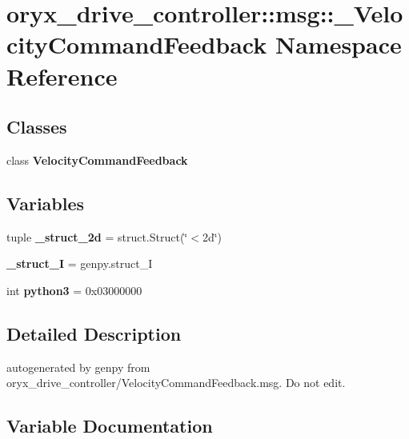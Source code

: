 \section{oryx\-\_\-drive\-\_\-controller\-:\-:msg\-:\-:\-\_\-\-Velocity\-Command\-Feedback \-Namespace \-Reference}
\label{namespaceoryx__drive__controller_1_1msg_1_1__VelocityCommandFeedback}
\subsection*{\-Classes}
\begin{DoxyCompactItemize}
\item 
class {\bf \-Velocity\-Command\-Feedback}
\end{DoxyCompactItemize}
\subsection*{\-Variables}
\begin{DoxyCompactItemize}
\item 
tuple {\bf \-\_\-struct\-\_\-2d} = struct.\-Struct(\char`\"{}$<$2d\char`\"{})
\item 
{\bf \-\_\-struct\-\_\-\-I} = genpy.\-struct\-\_\-\-I
\item 
int {\bf python3} = 0x03000000
\end{DoxyCompactItemize}


\subsection{\-Detailed \-Description}
\begin{DoxyVerb}autogenerated by genpy from oryx_drive_controller/VelocityCommandFeedback.msg. Do not edit.\end{DoxyVerb}
 

\subsection{\-Variable \-Documentation}
